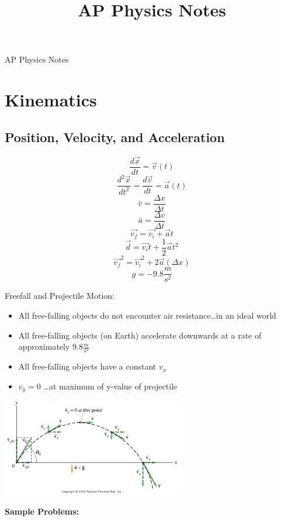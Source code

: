 \documentclass{article}
\title{AP Physics Notes}
\begin{document}
\begingroup  
  \centering
  \LARGE AP Physics Notes\\[1ex]
\endgroup

\section{Kinematics}
\subsection{Position, Velocity, and Acceleration}
\begin{multicols}{2}
\[\frac{d\vec{x}}{dt}=\vec{v}(t)\]
\[\frac{d^2\vec{x}}{dt^2}=\frac{d\vec{v}}{dt}=\vec{a}(t)\]
\[\bar{v}=\frac{\Delta{x}}{\Delta{t}}\]
\[\bar{a}=\frac{\Delta{v}}{\Delta{t}}\]
\[\vec{v_f}=\vec{v_i}+\vec{a}t\]
\[\vec{d}=\vec{v_i}t+\frac{1}{2}\vec{a}t^2\]
\[\vec{v_f}^2=\vec{v_i}^2+2\vec{a}(\Delta{x})\]
\[g=-9.8\frac{m}{s^2}\]

\columnbreak

Freefall and Projectile Motion:
\vspace{3mm}
\begin{itemize}
\item All free-falling objects do not encounter air resistance\ldots in an ideal world
\item All free-falling objects (on Earth) accelerate downwards at a rate of approximately $9.8\frac{m}{s^2}$
\item All free-falling objects have a constant $v_x$
\item $v_y=0$ \ldots at maximum of y-value of projectile
\end{itemize}

\vspace{2ex}
\includegraphics[width=8cm]{ProjectileMotion.jpg}

\end{multicols}
\textbf{Sample Problems:}
\end{document}
